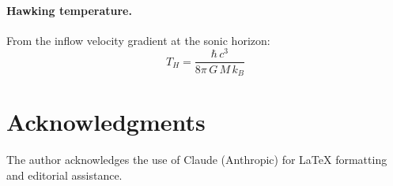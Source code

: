 ﻿\documentclass[12pt,letterpaper]{article}
\begin{document}
\paragraph{Hawking temperature.}
From the inflow velocity gradient at the sonic horizon:
%
\begin{equation}
  T_H = \frac{\hbar\,c^3}{8\pi\,G\,M\,k_B}
  \label{eq:sum-hawking}
\end{equation}



\section*{Acknowledgments}

The author acknowledges the use of Claude (Anthropic) for \LaTeX{} formatting
and editorial assistance.

\bigskip


\end{document}
